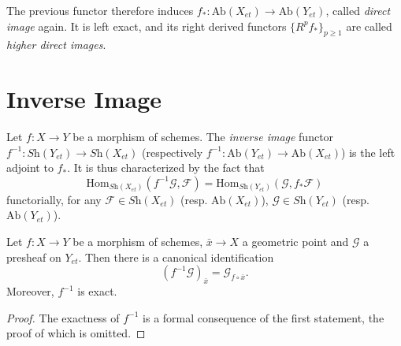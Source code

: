 \begin{definition}
\label{definition-direct-image-sheaf}
The previous functor therefore induces $f_*:\text{Ab}(X_{et})\to
\text{Ab}(Y_{et})$, called {\it direct image} again. It is left exact, and its
right derived functors $\{R^pf_*\}_{p \geq 1}$ are called
{\it higher direct images}.
\end{definition}





\section{Inverse Image}
\label{section-inverse-image}

\begin{definition}
\label{definition-inverse-image}
Let $f: X\to Y$ be a morphism of schemes. The {\it inverse image} functor
$f^{-1} : \textit{Sh}(Y_{et})\to \textit{Sh}(X_{et})$
(respectively
$f^{-1}: \text{Ab}(Y_{et}) \to \text{Ab}(X_{et})$)
is the left adjoint to $f_*$. It is
thus characterized by the fact that
$$
\text{Hom}_{{\textit{Sh}(X_{et})}} (f^{-1}\mathcal{G}, \mathcal{F}) =
\text{Hom}_{\textit{Sh}(Y_{et})} (\mathcal{G}, f_*\mathcal{F})
$$
functorially, for any $\mathcal{F} \in \textit{Sh}(X_{et})$ (resp.
$\text{Ab}(X_{et})$), $\mathcal{G} \in \textit{Sh}(Y_{et})$ (resp.
$\text{Ab}(Y_{et})$).
\end{definition}

\begin{lemma}
\label{lemma-stalk-pullback}
Let $f : X \to Y$ be a morphism of schemes, $\bar x \to X$ a geometric point
and $\mathcal{G}$ a presheaf on $Y_{et}$. Then there is a canonical
identification
$$
\left(f^{-1}\mathcal{G}\right)_{\bar x} = \mathcal{G}_{f\circ \bar x}.
$$
Moreover, $f^{-1}$ is exact.
\end{lemma}

\begin{proof}
The exactness of $f^{-1}$ is a formal consequence of the first statement, the
proof of which is omitted.
\end{proof}

